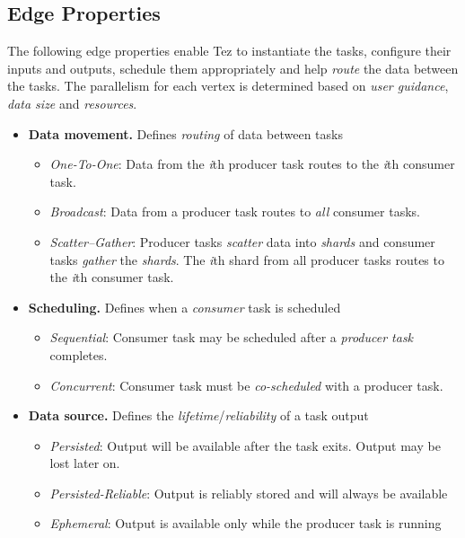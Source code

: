 \documentclass[twocolumn]{article}
\begin{document}
\subsection{Edge Properties}
The following edge properties enable Tez to instantiate the tasks,
configure their inputs and outputs, schedule them appropriately and help
\emph{route} the data between the tasks. The parallelism for each vertex
is determined based on \emph{user guidance}, \emph{data size} and
\emph{resources}.

\begin{itemize}
\item
  \textbf{Data movement.} Defines \emph{routing} of data between tasks
  \begin{itemize}
  \item
    \emph{One-To-One}: Data from the \emph{i}th producer task routes to
    the \emph{i}th consumer task.
  \item
    \emph{Broadcast}: Data from a producer task routes to \emph{all}
    consumer tasks.
  \item
    \emph{Scatter--Gather}: Producer tasks \emph{scatter} data into
    \emph{shards} and consumer tasks \emph{gather} the \emph{shards}.
    The \emph{i}th shard from all producer tasks routes to the
    \emph{i}th consumer task.
  \end{itemize}
\item
  \textbf{Scheduling.} Defines when a \emph{consumer} task is
  scheduled
  \begin{itemize}
  \item
    \emph{Sequential}: Consumer task may be scheduled after a
    \emph{producer task} completes.
  \item
    \emph{Concurrent}: Consumer task must be \emph{co-scheduled} with a
    producer task.
  \end{itemize}
\item
  \textbf{Data source.} Defines the \emph{lifetime}/\emph{reliability}
  of a task output
  \begin{itemize}
  \item
    \emph{Persisted}: Output will be available after the task exits.
    Output may be lost later on.
  \item
    \emph{Persisted-Reliable}: Output is reliably stored and will always
    be available
  \item
    \emph{Ephemeral}: Output is available only while the producer task
    is running
  \end{itemize}
\end{itemize}
\end{document}

